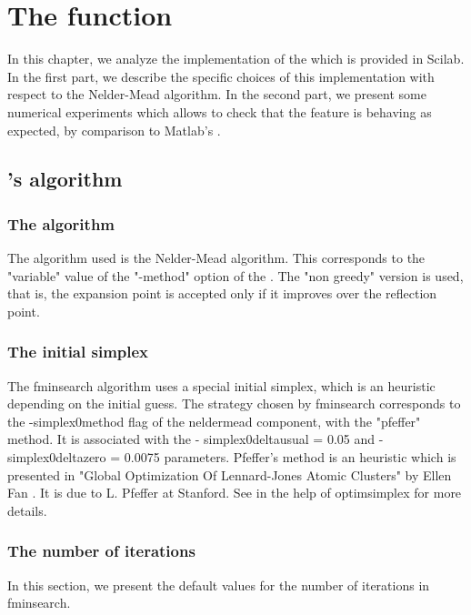 \chapter{The  function}

In this chapter, we analyze the implementation of the 
which is provided in Scilab. In the first part, we describe the specific 
choices of this implementation with respect to the Nelder-Mead algorithm.
In the second part, we present some numerical experiments which 
allows to check that the feature is behaving as expected, by comparison 
to Matlab's .

\section{'s algorithm}

\subsection{The algorithm}

The algorithm used is the Nelder-Mead algorithm. This corresponds to the 
"variable" value of the "-method" option of the .
The "non greedy" version is used, that is, the expansion point is 
accepted only if it improves over the reflection point.

\subsection{The initial simplex}

The fminsearch algorithm uses a special initial simplex, which is an 
heuristic depending on the initial guess. The strategy chosen by 
fminsearch corresponds to the -simplex0method flag of the neldermead 
component, with the "pfeffer" method. It is associated with the -
simplex0deltausual = 0.05 and -simplex0deltazero = 0.0075 parameters. 
Pfeffer's method is an heuristic which is presented in "Global 
Optimization Of Lennard-Jones Atomic Clusters" by Ellen Fan \cite{Fan2002}. 
It is due to L. Pfeffer at Stanford. See in the help of optimsimplex for more 
details.

\subsection{The number of iterations}

In this section, we present the default values for the number of 
iterations in fminsearch.

